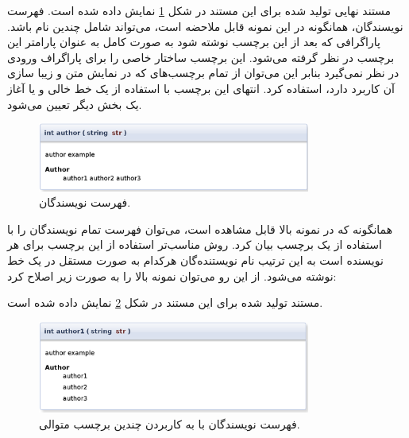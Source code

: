 مستند نهایی تولید شده برای این مستند در شکل
\ref{write/document-the-code/developer-info/author-multi} نمایش داده شده است.
فهرست نویسندگان، همانگونه در این نمونه قابل ملاحضه است، می‌تواند شامل چندین نام
باشد.
پاراگرافی که بعد از این برچسب نوشته شود به صورت کامل به عنوان پارامتر این برچسب
در نظر گرفته می‌شود.
این برچسب ساختار خاصی را برای پاراگراف ورودی در نظر نمی‌گیرد بنابر این می‌توان
از تمام برچسب‌های که در نمایش متن و زیبا سازی آن کاربرد دارد، استفاده کرد.
انتهای این برچسب با استفاده از یک خط خالی و یا آغاز یک بخش دیگر تعیین می‌شود.
\begin{figure}
	\centering
	\includegraphics[width=0.8\textwidth]{image/write/document-the-code/developer-info/author-multi}
	\caption[فهرست نویسندگان]{
		فهرست نویسندگان.
	}
	\label{write/document-the-code/developer-info/author-multi}
\end{figure}


همانگونه که در نمونه بالا قابل مشاهده است، می‌توان فهرست تمام نویسندگان را با
استفاده از یک برچسب بیان کرد.
روش مناسب‌تر استفاده از این برچسب برای هر نویسنده است به این ترتیب نام
نویستنده‌گان هرکدام به صورت مستقل در یک خط نوشته می‌شود.
از این رو می‌توان نمونه بالا را به صورت زیر اصلاح کرد:
مستند تولید شده برای این مستند در شکل \ref{write/document-the-code/developer-info/author-multi1}
نمایش داده شده است.
\begin{figure}
	\centering
	\includegraphics[width=0.8\textwidth]{image/write/document-the-code/developer-info/author-multi1}
	\caption[فهرست نویسندگان]{
		فهرست نویسندگان با به کاربردن چندین برچسب متوالی.
	}
	\label{write/document-the-code/developer-info/author-multi1}
\end{figure}

